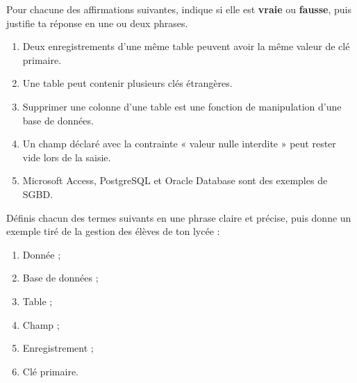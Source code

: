 \documentclass[11pt]{article}
\begin{document}
\begin{exercice}
Pour chacune des affirmations suivantes, indique si elle est \textbf{vraie} ou \textbf{fausse}, puis justifie ta réponse en une ou deux phrases.
\begin{enumerate}
\item Deux enregistrements d'une même table peuvent avoir la même valeur de clé primaire.
\item Une table peut contenir plusieurs clés étrangères.
\item Supprimer une colonne d'une table est une fonction de manipulation d'une base de données.
\item Un champ déclaré avec la contrainte « valeur nulle interdite » peut rester vide lors de la saisie.
\item Microsoft Access, PostgreSQL et Oracle Database sont des exemples de SGBD.
\end{enumerate}
\end{exercice}

\begin{exercice}[Définitions]
Définis chacun des termes suivants en une phrase claire et précise, puis donne un exemple tiré de la gestion des élèves de ton lycée :
\begin{enumerate}
\item Donnée ;
\item Base de données ;
\item Table ;
\item Champ ;
\item Enregistrement ;
\item Clé primaire.
\end{enumerate}
\end{exercice}
\end{document}
